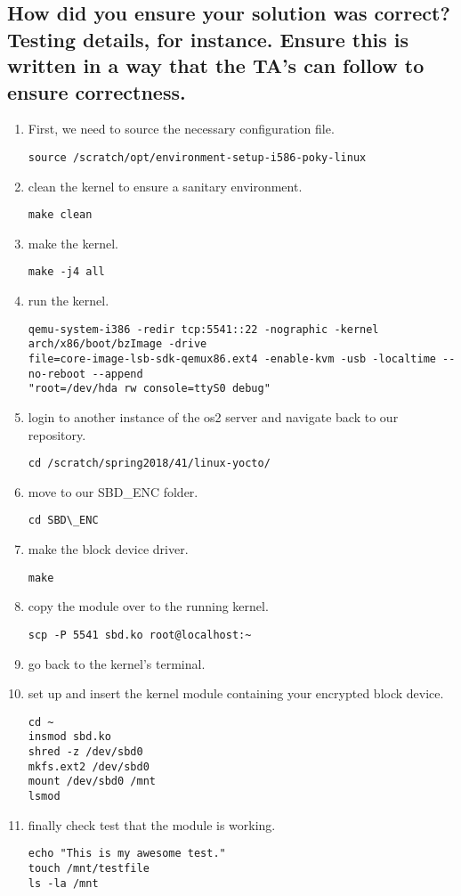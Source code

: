 \documentclass[draftclsnofoot, onecolumn, compsoc, 10pt]{IEEEtran}
\begin{document}
    \subsection{How did you ensure your solution was correct? Testing details, for instance. Ensure this is written in a way that the TA's can follow to ensure correctness.}
        \begin{enumerate}
            \item First, we need to source the necessary configuration file.

\begin{lstlisting}
source /scratch/opt/environment-setup-i586-poky-linux
\end{lstlisting}

            \item clean the kernel to ensure a sanitary environment.
\begin{lstlisting}
make clean
\end{lstlisting}
            \item make the kernel.
\begin{lstlisting}
make -j4 all
\end{lstlisting}
            \item run the kernel.
\begin{lstlisting}
qemu-system-i386 -redir tcp:5541::22 -nographic -kernel arch/x86/boot/bzImage -drive
file=core-image-lsb-sdk-qemux86.ext4 -enable-kvm -usb -localtime --no-reboot --append
"root=/dev/hda rw console=ttyS0 debug"
\end{lstlisting}

	\item login to another instance of the os2 server and navigate back to our repository.
\begin{lstlisting}
cd /scratch/spring2018/41/linux-yocto/
\end{lstlisting}
	\item move to our SBD\_ENC folder.
\begin{lstlisting}
cd SBD\_ENC
\end{lstlisting}

\item make the block device driver.
\begin{lstlisting}
make
\end{lstlisting}

\item copy the module over to the running kernel.
\begin{lstlisting}
scp -P 5541 sbd.ko root@localhost:~
\end{lstlisting}
\item go back to the kernel's terminal.
\item set up and insert the kernel module containing your encrypted block device.
\begin{lstlisting}
cd ~
insmod sbd.ko
shred -z /dev/sbd0
mkfs.ext2 /dev/sbd0
mount /dev/sbd0 /mnt
lsmod
\end{lstlisting}
\item finally check test that the module is working.
\begin{lstlisting}
echo "This is my awesome test."
touch /mnt/testfile
ls -la /mnt


\end{lstlisting}
\end{enumerate}
\end{document}
